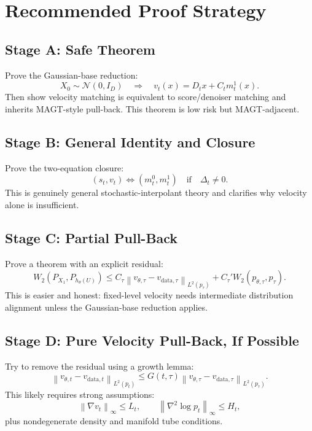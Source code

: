 \documentclass[11pt]{article}
\newcommand{\cN}{\mathcal{N}}
\newcommand{\norm}[1]{\left\lVert #1 \right\rVert}
\newcommand{\data}{\mathrm{data}}
\theoremstyle{plain}
\theoremstyle{definition}
\begin{document}
\section{Recommended Proof Strategy}

\subsection{Stage A: Safe Theorem}

Prove the Gaussian-base reduction:
\begin{equation}
X_0\sim\cN(0,I_D)
\quad
\Longrightarrow
\quad
v_t(x)=D_tx+C_tm_t^1(x).
\end{equation}
Then show velocity matching is equivalent to score/denoiser matching and
inherits MAGT-style pull-back. This theorem is low risk but MAGT-adjacent.

\subsection{Stage B: General Identity and Closure}

Prove the two-equation closure:
\begin{equation}
(s_t,v_t)
\Longleftrightarrow
(m_t^0,m_t^1)
\quad
\text{if}
\quad
\Delta_t\ne0.
\end{equation}
This is genuinely general stochastic-interpolant theory and clarifies why
velocity alone is insufficient.

\subsection{Stage C: Partial Pull-Back}

Prove a theorem with an explicit residual:
\begin{equation}
W_2(P_{X_1},P_{h_\theta(U)})
\le
C_\tau
\norm{v_{\theta,\tau}-v_{\data,\tau}}_{L^2(p_\tau)}
+
C_\tau'
W_2(p_{\theta,\tau},p_\tau).
\end{equation}
This is easier and honest: fixed-level velocity needs intermediate distribution
alignment unless the Gaussian-base reduction applies.

\subsection{Stage D: Pure Velocity Pull-Back, If Possible}

Try to remove the residual using a growth lemma:
\begin{equation}
\norm{v_{\theta,t}-v_{\data,t}}_{L^2(p_t)}
\le
G(t,\tau)
\norm{v_{\theta,\tau}-v_{\data,\tau}}_{L^2(p_\tau)}.
\end{equation}
This likely requires strong assumptions:
\begin{equation}
\norm{\nabla v_t}_{\infty}\le L_t,
\qquad
\norm{\nabla^2\log p_t}_{\infty}\le H_t,
\end{equation}
plus nondegenerate density and manifold tube conditions.
\end{document}
